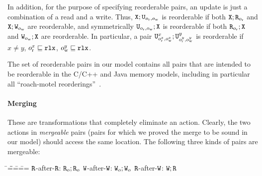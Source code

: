 In addition, for the purpose of specifying reorderable pairs, an update is just a combination of a read and a write.
Thus, $\texttt{X};\texttt{U}_{o_{\text{r}},o_{\text{w}}}$ is reorderable if both $\texttt{X};\texttt{R}_{o_{\text{r}}}$ and $\texttt{X};\texttt{W}_{o_{\text{w}}}$ are reorderable,
and symmetrically  $\texttt{U}_{o_{\text{r}},o_{\text{w}}};\texttt{X}$ is reorderable if both $\texttt{R}_{o_{\text{r}}};\texttt{X}$ and $\texttt{W}_{o_{\text{w}}};\texttt{X}$ are reorderable.
In particular, a pair $\texttt{U}^x_{o^x_{\text{r}},o^x_{\text{w}}}; \texttt{U}^y_{o^y_{\text{r}},o^y_{\text{w}}}$
is reorderable if $x\neq y$, $o_{\text{r}}^x \sqsubseteq \texttt{rlx}$, $o_{\text{w}}^y \sqsubseteq \texttt{rlx}$.

The set of reorderable pairs in our model contains all pairs that are intended to be reorderable in the C/C++ 
and Java memory models,
including in particular all ``roach-motel reorderings''~\cite{c11comp,sevcik:jmm}.


\paragraph{Merging}
These are transformations that completely eliminate an action.
Clearly, the two actions in \emph{mergeable} pairs (pairs for which we proved the merge to be sound in our model)
should access the same location. The following three kinds of pairs are mergeable:
\begin{tabbing}
\hspace{1.4cm}\=\hspace{1.5cm}=\=\hspace{1.4cm}\=\hspace{1.5cm}=\=\hspace{1.4cm}=\=\hspace{1.5cm}=\kill
 $\texttt{R}$-after-$\texttt{R}$: \>  $\texttt{R}_o;\texttt{R}_o$ \>  $\texttt{W}$-after-$\texttt{W}$: \>   $\texttt{W}_o;\texttt{W}_o$ \>  $\texttt{R}$-after-$\texttt{W}$: \> $\texttt{W};\texttt{R}$
\end{tabbing} 


